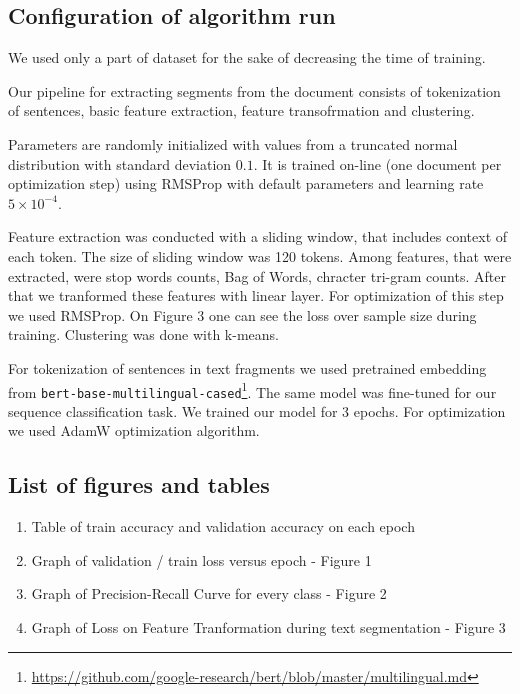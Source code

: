 \documentclass{article}
\begin{document}
\subsection{Configuration of algorithm run}

We used only a part of dataset for the sake of decreasing the time of training. 

Our pipeline for extracting segments from the document consists of tokenization of sentences, basic feature extraction, feature transofrmation and clustering. 

Parameters are randomly initialized with values from a truncated normal distribution with standard deviation $0.1$. It is trained on-line (one document per optimization step) using RMSProp \citep{tielman-2012} with default parameters and learning rate $5\times 10^{-4}$.

Feature extraction was conducted with a sliding window, that includes context of each token. The size of sliding window was 120 tokens. Among features, that were extracted, were stop words counts, Bag of Words, chracter tri-gram counts. After that we tranformed these features with linear layer. For optimization of this step we used RMSProp. On Figure 3 one can see the loss over sample size during training. Clustering was done with k-means.


For tokenization of sentences in text fragments we used pretrained embedding from \texttt{bert-base-multilingual-cased}\footnote{\url{https://github.com/google-research/bert/blob/master/multilingual.md}}. The same model was fine-tuned for our sequence classification task. We trained our model for 3 epochs. For optimization we used AdamW optimization algorithm\cite{adam-w}.


\subsection{List of figures and tables}
\begin{enumerate}
    \item Table of train accuracy and validation accuracy on each epoch
    \item Graph of validation / train loss versus epoch - Figure 1
    \item Graph of Precision-Recall Curve for every class - Figure 2
    \item Graph of Loss on Feature Tranformation during text segmentation - Figure 3 
\end{enumerate}

\end{document}
